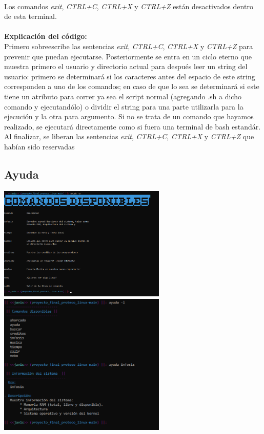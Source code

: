 \documentclass[12pt,a4paper]{article}
\begin{document}
    \justifying
    \noindent
    \\Los comandos \textit{exit}, \textit{CTRL+C}, \textit{CTRL+X} y \textit{CTRL+Z} están desactivados dentro de esta terminal.
    \\\\
    \noindent
    \textbf{Explicación del código:}\\
    Primero sobreescribe las sentencias \textit{exit}, \textit{CTRL+C}, \textit{CTRL+X} y \textit{CTRL+Z} para prevenir que puedan ejecutarse. Posteriormente se entra en un ciclo eterno que muestra primero el usuario y directorio actual para después leer un string del usuario: primero se determinará si los caracteres antes del espacio de este string corresponden a uno de los comandos; en caso de que lo sea se determinará si este tiene un atributo para correr ya sea el script normal (agregando .sh a dicho comando y ejecutandólo) o dividir el string para una parte utilizarla para la ejecución y la otra para argumento. Si no se trata de un comando que hayamos realizado, se ejecutará directamente como si fuera una terminal de bash estandár. Al finalizar, se liberan las sentencias \textit{exit}, \textit{CTRL+C}, \textit{CTRL+X} y \textit{CTRL+Z} que habían sido reservadas
\newpage
\justifying
\subsection{Ayuda}
    \centering
    \includegraphics[width=8cm]{img/ayuda1.png} \\
    \includegraphics[width=8cm]{img/ayuda2.png}
\end{document}
